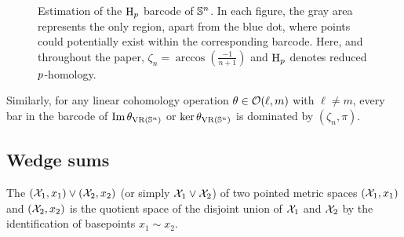 
\begin{figure}[ht]
	\centering
	
	\caption{Estimation of the $\mathrm{H}_p $ barcode of $\mathbb{S}^n$.
		In each figure, the gray area represents the only region, apart from the blue dot, where points could potentially exist within the corresponding barcode.
		Here, and throughout the paper, $\zeta_n = \arccos(\tfrac{-1}{n+1})$ and $\mathrm{H}_p $ denotes reduced $p$-homology. 
        }
	\label{fig:Sk}
\end{figure}

Similarly, for any linear cohomology operation $\theta \in \mathcal{O}(\ell,m)$ with $\ell \neq m$, every bar in the barcode of $\operatorname{Im}\theta_{\operatorname{VR}(\mathbb{S}^n)}$ or $\ker\theta_{\operatorname{VR}(\mathbb{S}^n)}$ is dominated by $(\zeta_n,\pi)$.


\subsection{Wedge sums}

The  $(\mathcal{X}_1, x_1) \vee (\mathcal{X}_2, x_2)$ (or simply $\mathcal{X}_1 \vee \mathcal{X}_2$) of two pointed metric spaces $(\mathcal{X}_1, x_1)$ and $(\mathcal{X}_2, x_2)$ is the quotient space of the disjoint union of $\mathcal{X}_1$ and $\mathcal{X}_2$ by the identification of basepoints $x_1 \sim x_2$.


